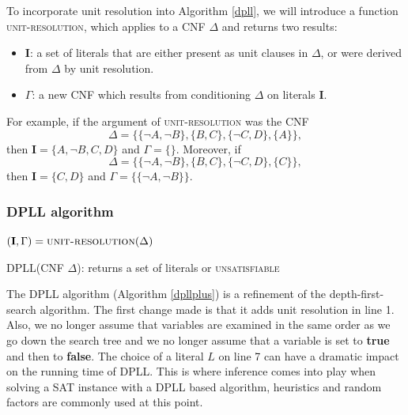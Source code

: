 \documentclass[12pt]{diicc}
\begin{document}
To incorporate unit resolution into Algorithm \ref{dpll}, we will introduce a function \textsc{unit-resolution}, which applies to a CNF $\Delta$ and returns two results:
\begin{itemize}
	\item \textbf{I}: a set of literals that are either present as unit clauses in $\Delta$, or were derived from $\Delta$ by unit resolution.
	\item $\Gamma$: a new CNF which results from conditioning $\Delta$ on literals \textbf{I}.
\end{itemize}
For example, if the argument of \textsc{unit-resolution} was the CNF
\[\Delta=\{\{\neg A,\neg B\},\{B,C\},\{\neg C,D\},\{A\}\},\]
then $\textbf{I}=\{A,\neg B,C,D\}$ and $\Gamma=\{\}$. Moreover, if
\[\Delta=\{\{\neg A,\neg B\},\{B,C\},\{\neg C,D\},\{C\}\},\]
then $\textbf{I}=\{C,D\}$ and $\Gamma=\{\{\neg A,\neg B\}\}$.

\subsubsection{DPLL algorithm}

\begin{algorithm}
$(\textbf{I},\Gamma)=\textsc{unit-resolution}(\Delta)$\\
\caption{DPLL(CNF $\Delta$): returns a set of literals or \textsc{unsatisfiable}\label{dpllplus}}
\end{algorithm}    

The DPLL algorithm (Algorithm \ref{dpllplus}) is a refinement of the depth-first-search algorithm. The first change made is that it adds unit resolution in line 1. Also, we no longer assume that variables are examined in the same order as we go down the search tree and we no longer assume that a variable is set to \textbf{true} and then to \textbf{false}. The choice of a literal $L$ on line 7 can have a dramatic impact on the running time of DPLL. This is where inference comes into play when solving a SAT instance with a DPLL based algorithm, heuristics and random factors are commonly used at this point. 
\end{document}
